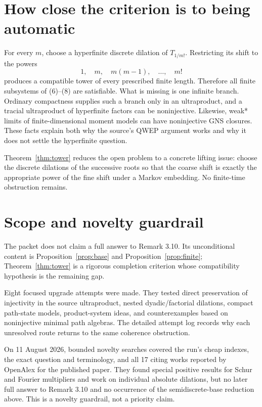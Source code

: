 \documentclass[11pt]{article}
\begin{document}
\section{How close the criterion is to being automatic}

For every $m$, choose a hyperfinite discrete dilation of
$T_{1/m!}$.  Restricting its shift to the powers
\[
 1,\quad m,\quad m(m-1),\quad\ldots,\quad m!
\]
produces a compatible tower of every prescribed finite length.  Therefore
all finite subsystems of (6)--(8) are satisfiable.  What is missing is one
infinite branch.  Ordinary compactness supplies such a branch only in an
ultraproduct, and a tracial ultraproduct of hyperfinite factors can be
noninjective.  Likewise, weak* limits of finite-dimensional moment models
can have noninjective GNS closures.  These facts explain both why the source's
QWEP argument works and why it does not settle the hyperfinite question.

Theorem~\ref{thm:tower} reduces the open problem to a concrete lifting issue:
choose the discrete dilations of the successive roots so that the coarse
shift is exactly the appropriate power of the fine shift under a Markov
embedding.  No finite-time obstruction remains.

\section{Scope and novelty guardrail}

The packet does not claim a full answer to Remark 3.10.  Its unconditional
content is Proposition~\ref{prop:base} and
Proposition~\ref{prop:finite}; Theorem~\ref{thm:tower} is a rigorous
completion criterion whose compatibility hypothesis is the remaining gap.

Eight focused upgrade attempts were made.  They tested direct preservation
of injectivity in the source ultraproduct, nested dyadic/factorial dilations,
compact path-state models, product-system ideas, and counterexamples based on
noninjective minimal path algebras.  The detailed attempt log records why
each unresolved route returns to the same coherence obstruction.

On 11 August 2026, bounded novelty searches covered the run's cheap indexes,
the exact question and terminology, and all 17 citing works reported by
OpenAlex for the published paper.  They found special positive results for
Schur and Fourier multipliers and work on individual absolute dilations, but
no later full answer to Remark 3.10 and no occurrence of the
semidiscrete-base reduction above.  This is a novelty guardrail, not a
priority claim.
\end{document}
